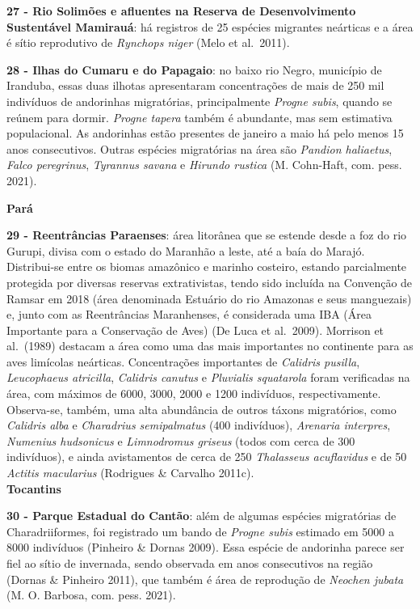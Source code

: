 \documentclass[
  oneside]{scrbook}
\begin{document}
\textbf{27 - Rio Solimões e afluentes na Reserva de Desenvolvimento Sustentável Mamirauá}: há registros de 25 espécies migrantes neárticas e a área é sítio reprodutivo de \emph{Rynchops niger} (Melo et al.~2011).

\textbf{28 - Ilhas do Cumaru e do Papagaio}: no baixo rio Negro, município de Iranduba, essas duas ilhotas apresentaram concentrações de mais de 250 mil indivíduos de andorinhas migratórias, principalmente \emph{Progne subis}, quando se reúnem para dormir. \emph{Progne tapera} também é abundante, mas sem estimativa populacional. As andorinhas estão presentes de janeiro a maio há pelo menos 15 anos consecutivos. Outras espécies migratórias na área são \emph{Pandion haliaetus}, \emph{Falco peregrinus}, \emph{Tyrannus savana} e \emph{Hirundo rustica} (M. Cohn-Haft, com. pess. 2021).

\textbf{Pará}

\textbf{29 - Reentrâncias Paraenses}: área litorânea que se estende desde a foz do rio Gurupi, divisa com o estado do Maranhão a leste, até a baía do Marajó. Distribui-se entre os biomas amazônico e marinho costeiro, estando parcialmente protegida por diversas reservas extrativistas, tendo sido incluída na Convenção de Ramsar em 2018 (área denominada Estuário do rio Amazonas e seus manguezais) e, junto com as Reentrâncias Maranhenses, é considerada uma IBA (Área Importante para a Conservação de Aves) (De Luca et al.~2009). Morrison et al.~(1989) destacam a área como uma das mais importantes no continente para as aves limícolas neárticas. Concentrações importantes de \emph{Calidris pusilla}, \emph{Leucophaeus atricilla}, \emph{Calidris canutus} e \emph{Pluvialis squatarola} foram verificadas na área, com máximos de 6000, 3000, 2000 e 1200 indivíduos, respectivamente. Observa-se, também, uma alta abundância de outros táxons migratórios, como \emph{Calidris alba} e \emph{Charadrius semipalmatus} (400 indivíduos), \emph{Arenaria interpres}, \emph{Numenius hudsonicus} e \emph{Limnodromus griseus} (todos com cerca de 300 indivíduos), e ainda avistamentos de cerca de 250 \emph{Thalasseus acuflavidus} e de 50 \emph{Actitis macularius} (Rodrigues \& Carvalho 2011c).\\
\textbf{Tocantins}

\textbf{30 - Parque Estadual do Cantão}: além de algumas espécies migratórias de Charadriiformes, foi registrado um bando de \emph{Progne subis} estimado em 5000 a 8000 indivíduos (Pinheiro \& Dornas 2009). Essa espécie de andorinha parece ser fiel ao sítio de invernada, sendo observada em anos consecutivos na região (Dornas \& Pinheiro 2011), que também é área de reprodução de \emph{Neochen jubata} (M. O. Barbosa, com. pess. 2021).
\end{document}
